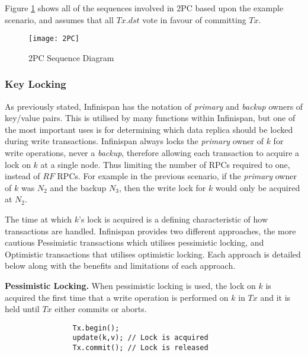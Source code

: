 	       Figure \ref{fig:2PC} shows all of the sequences involved in 2PC based upon the example scenario, and assumes that all $Tx.dst$ vote in favour of committing $Tx$.  
	       	       
            \begin{figure}[htbp!] 
                \centering    
                \texttt{[image: 2PC]}
                \caption[Two-phase Commit Protocol]{2PC Sequence Diagram}
                \label{fig:2PC}
            \end{figure}
            
	        \subsubsection*{Key Locking}
	        As previously stated, Infinispan has the notation of \emph{primary} and \emph{backup} owners of key/value pairs.  This is utilised by many functions within Infinispan, but one of the most important uses is for determining which data replica should be locked during write transactions.  Infinispan always locks the \emph{primary} owner of $k$ for write operations, never a \emph{backup}, therefore allowing each transaction to acquire a lock on $k$ at a single node.  Thus limiting the number of RPCs required to one, instead of $RF$ RPCs. For example in the previous scenario, if the \emph{primary} owner of $k$ was $N_2$ and the backup $N_3$, then the write lock for $k$ would only be acquired at $N_2$.  
	        
	        The time at which $k$'s lock is acquired is a defining characteristic of how transactions are handled.  Infinispan provides two different approaches, the more cautious Pessimistic transactions which utilises pessimistic locking, and Optimistic transactions that utilises optimistic locking.  Each approach is detailed below along with the benefits and limitations of each approach.  
	         
            \textbf{Pessimistic Locking.}
            When pessimistic locking\citep{Bernstein:1981:CCD:356842.356846} is used, the lock on $k$ is acquired the first time that a write operation is performed on $k$ in $Tx$ and it is held until $Tx$ either commits or aborts.  
	       		    
		    \begin{lstlisting}
		    	Tx.begin();
		    	update(k,v); // Lock is acquired
		    	Tx.commit(); // Lock is released
		    \end{lstlisting}


